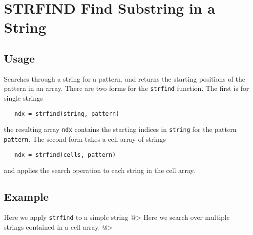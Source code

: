 \section{STRFIND Find Substring in a String}

\subsection{Usage}

Searches through a string for a pattern, and returns the starting
positions of the pattern in an array.  There are two forms for 
the \verb|strfind| function.  The first is for single strings
\begin{verbatim}
   ndx = strfind(string, pattern)
\end{verbatim}
the resulting array \verb|ndx| contains the starting indices in \verb|string|
for the pattern \verb|pattern|.  The second form takes a cell array of 
strings
\begin{verbatim}
   ndx = strfind(cells, pattern)
\end{verbatim}
and applies the search operation to each string in the cell array.
\subsection{Example}

Here we apply \verb|strfind| to a simple string
@>
Here we search over multiple strings contained in a cell array.
@>
